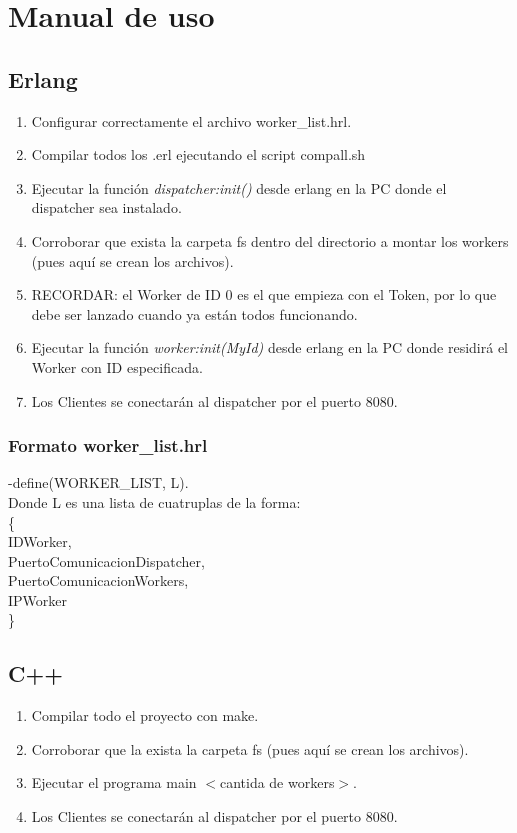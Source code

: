 \documentclass[12pt]{article}
\begin{document}
\section{Manual de uso}
\subsection{Erlang}
\begin{enumerate}
\item Configurar correctamente el archivo worker\_list.hrl.
\item Compilar todos los .erl ejecutando el script compall.sh
\item Ejecutar la función \textit{dispatcher:init()}  desde erlang en la PC donde el dispatcher sea instalado.
\item Corroborar que exista la carpeta fs dentro del directorio a montar los workers (pues aquí se crean los archivos).
\item RECORDAR: el Worker de ID 0 es el que empieza con el Token, por lo que debe ser lanzado cuando ya están todos funcionando.
\item Ejecutar la función \textit{worker:init(MyId)}  desde erlang en la PC donde residirá el Worker con ID especificada.
\item Los Clientes se conectarán al dispatcher por el puerto 8080.
\end{enumerate}

\subsubsection{Formato worker\_list.hrl}
-define(WORKER\_LIST, L).\\
Donde L es una lista de cuatruplas de la forma:\\ \{\\IDWorker,\\ PuertoComunicacionDispatcher, \\PuertoComunicacionWorkers, \\IPWorker \\ \}


\subsection{C++}
\begin{enumerate}
\item Compilar todo el proyecto con make.
\item Corroborar que la exista la carpeta fs (pues aquí se crean los archivos).
\item Ejecutar el programa main $<$cantida de workers$>$.
\item Los Clientes se conectarán al dispatcher por el puerto 8080.
\end{enumerate}
\end{document}
